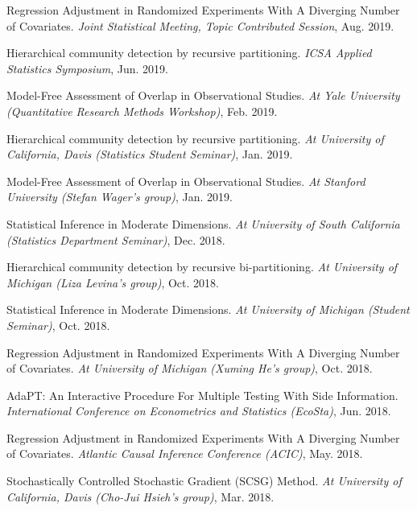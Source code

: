 \documentclass{article}
\begin{document}
\vspace{2mm}
Regression Adjustment in Randomized Experiments With A Diverging Number of Covariates. \emph{Joint Statistical Meeting, Topic Contributed Session}, Aug. 2019.

\vspace{2mm}
Hierarchical community detection by recursive partitioning. \emph{ICSA Applied Statistics Symposium}, Jun. 2019.

\vspace{2mm}
Model-Free Assessment of Overlap in Observational Studies. \emph{At Yale University (Quantitative Research Methods Workshop)}, Feb. 2019.

\vspace{2mm}
Hierarchical community detection by recursive partitioning. \emph{At University of California, Davis (Statistics Student Seminar)}, Jan. 2019.

\vspace{2mm}
Model-Free Assessment of Overlap in Observational Studies. \emph{At Stanford University (Stefan Wager's group)}, Jan. 2019.

\vspace{2mm}
Statistical Inference in Moderate Dimensions. \emph{At University of South California (Statistics Department Seminar)}, Dec. 2018.

\vspace{2mm}
Hierarchical community detection by recursive bi-partitioning. \emph{At University of Michigan (Liza Levina's group)}, Oct. 2018.

\vspace{2mm}
Statistical Inference in Moderate Dimensions. \emph{At University of Michigan (Student Seminar)}, Oct. 2018.

\vspace{2mm}
Regression Adjustment in Randomized Experiments With A Diverging Number of Covariates. \emph{At University of Michigan (Xuming He's group)}, Oct. 2018.

\vspace{2mm}
AdaPT: An Interactive Procedure For Multiple Testing With Side Information. \emph{International Conference on Econometrics and Statistics (EcoSta)}, Jun. 2018.

\vspace{2mm}
Regression Adjustment in Randomized Experiments With A Diverging Number of Covariates. \emph{Atlantic Causal Inference Conference (ACIC)}, May. 2018.

\vspace{2mm}
Stochastically Controlled Stochastic Gradient (SCSG) Method. \emph{At University of California, Davis (Cho-Jui Hsieh's group)}, Mar. 2018.
\end{document}
